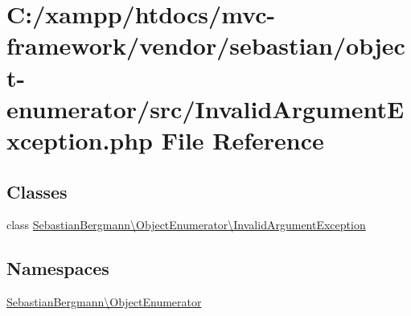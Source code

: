 \hypertarget{sebastian_2object-enumerator_2src_2_invalid_argument_exception_8php}{}\section{C\+:/xampp/htdocs/mvc-\/framework/vendor/sebastian/object-\/enumerator/src/\+Invalid\+Argument\+Exception.php File Reference}
\label{sebastian_2object-enumerator_2src_2_invalid_argument_exception_8php}
\subsection*{Classes}
\begin{DoxyCompactItemize}
\item 
class \hyperlink{class_sebastian_bergmann_1_1_object_enumerator_1_1_invalid_argument_exception}{Sebastian\+Bergmann\textbackslash{}\+Object\+Enumerator\textbackslash{}\+Invalid\+Argument\+Exception}
\end{DoxyCompactItemize}
\subsection*{Namespaces}
\begin{DoxyCompactItemize}
\item 
 \hyperlink{namespace_sebastian_bergmann_1_1_object_enumerator}{Sebastian\+Bergmann\textbackslash{}\+Object\+Enumerator}
\end{DoxyCompactItemize}
